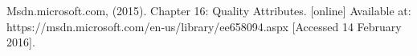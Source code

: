 	\begin{itemize}

		 Msdn.microsoft.com, (2015). Chapter 16: Quality Attributes.
				[online]  Available at: https://msdn.microsoft.com/en-us/library/ee658094.aspx [Accessed 14 February 2016].

	\end{itemize}